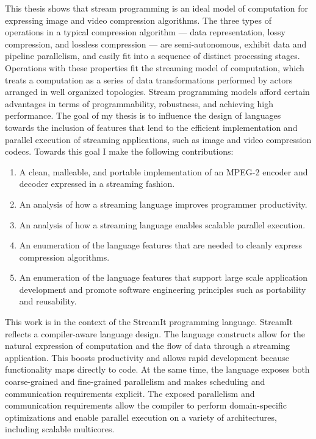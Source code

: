 This thesis shows that stream programming is an ideal model of 
computation for expressing image and video compression algorithms. The three 
types of operations in a typical compression algorithm --- data representation, 
lossy compression, and lossless compression --- are semi-autonomous, exhibit 
data and pipeline parallelism, and easily fit into a sequence of distinct 
processing stages. Operations with these properties fit
the streaming model of computation, 
which treats a computation as a series of data transformations performed by 
actors arranged in well organized topologies. Stream programming models afford 
certain advantages in terms of programmability, robustness, and achieving high 
performance. The goal of my thesis is to influence the design of languages 
towards the inclusion of features that lend to the efficient implementation and parallel 
execution of streaming applications, such as image and video compression codecs. 
Towards this goal I make the following contributions:

\begin{enumerate}
 \item A clean, malleable, and portable implementation of an MPEG-2 encoder and decoder expressed in a streaming fashion.
 \item An analysis of how a streaming language improves programmer productivity.
 \item An analysis of how a streaming language enables scalable parallel execution.
 \item An enumeration of the language features that are needed to cleanly express compression algorithms.
 \item An enumeration of the language features that support large scale application development 
and promote software engineering principles such as portability and reusability.
\end{enumerate}

This work is in the context of the StreamIt programming language. StreamIt reflects
a compiler-aware language design. The language constructs allow for the natural expression 
of computation and the flow of data through a streaming application. This boosts 
productivity and allows rapid development because functionality maps directly to code. 
At the same time, the language exposes both coarse-grained and fine-grained parallelism and 
makes scheduling and communication requirements explicit. The exposed parallelism and
communication requirements  allow the compiler to perform 
domain-specific optimizations and enable parallel execution on a variety of architectures, 
including scalable multicores. 

